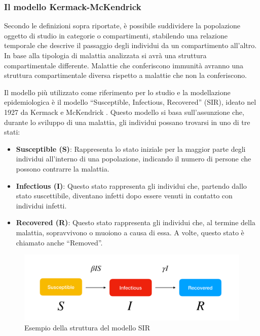 \subsubsection{Il modello Kermack-McKendrick}

Secondo le definizioni sopra riportate, è possibile suddividere la 
popolazione oggetto di studio in categorie o compartimenti, stabilendo 
una relazione temporale che descrive il passaggio degli individui da un 
compartimento all'altro. In base alla tipologia di malattia analizzata
si avrà una struttura compartimentale differente. Malattie che conferiscono 
immunità avranno una struttura compartimentale diversa rispetto a 
malattie che non la conferiscono.

Il modello più utilizzato come riferimento per lo studio e la 
modellazione epidemiologica è il modello ``Susceptible, Infectious, 
Recovered'' (SIR), ideato nel 1927 da Kermack e McKendrick \cite{kermack1927contribution}. 
Questo modello si basa sull'assunzione che, durante lo sviluppo di una 
malattia, gli individui possano trovarsi in uno di tre stati:

\begin{itemize}
    \item \textbf{Susceptible (S)}: Rappresenta lo stato iniziale per la maggior parte degli individui all'interno di una popolazione, indicando il numero di persone che possono contrarre la malattia.
    \item \textbf{Infectious (I)}: Questo stato rappresenta gli individui che, partendo dallo stato suscettibile, diventano infetti dopo essere venuti in contatto con individui infetti.
    \item \textbf{Recovered (R)}: Questo stato rappresenta gli individui che, al termine della malattia, sopravvivono o muoiono a causa di essa. A volte, questo stato è chiamato anche ``Removed''.
\end{itemize}

\begin{figure}[H]
    \begin{center}
        \includegraphics[width=\linewidth]{img/sir.png}
        \caption{Esempio della struttura del modello SIR} 
        \label{fig:SIR_Structure}
    \end{center}
\end{figure}

